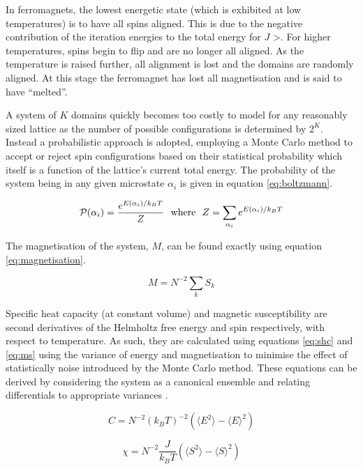 \documentclass[11pt]{article}   	%
\begin{document}
In ferromagnets, the lowest energetic state (which is exhibited at low temperatures) is to have all spins aligned. This is due to the negative contribution of the iteration energies to the total energy for $J$ \textgreater {}. For higher temperatures, spins begin to flip and are no longer all aligned. As the temperature is raised further, all alignment is lost and the domains are randomly aligned. At this stage the ferromagnet has lost all magnetisation and is said to have \textquotedblleft melted\textquotedblright.

A system of $K$ domains quickly becomes too costly to model for any reasonably sized lattice as the number of possible configurations is determined by $2^K$. Instead a probabilistic approach is adopted, employing a Monte Carlo method to accept or reject spin configurations based on their statistical probability which itself is a function of the lattice's current total energy. The probability of the system being in any given microstate $\alpha_i$ is given in equation \ref{eq:boltzmann}.

\begin{equation} \label{eq:boltzmann}
\mathcal{P}(\alpha_i) = \frac{e^{E(\alpha_i)/k_B T}}{Z} \text{\space\space where\space\space} Z = \sum\limits_{\alpha_i}e^{E(\alpha_i)/k_B T} 
\end{equation}

The magnetisation of the system, $M$, can be found exactly using equation \ref{eq:magnetisation}.

\begin{equation} \label{eq:magnetisation}
M = N^{-2}\sum\limits_{k}S_k
\end{equation}

Specific heat capacity (at constant volume) and magnetic susceptibility are second derivatives of the Helmholtz free energy and spin respectively, with respect to temperature. As such, they are calculated using equations \ref{eq:shc} and \ref{eq:ms} using the variance of energy and magnetisation to minimise the effect of statistically noise introduced by the Monte Carlo method. These equations can be derived by considering the system as a canonical ensemble and relating differentials to appropriate variances \cite{ohio state}.

\begin{equation} \label{eq:shc}
C = N^{-2}\left(k_B T\right)^{-2} \left(\langle E^2 \rangle - \langle E\rangle^2 \right)
\end{equation}

\begin{equation} \label{eq:ms}
\chi = N^{-2}\frac{J}{k_B T}\left( \langle S^2 \rangle - \langle S\rangle^2  \right)
\end{equation}
\end{document}
